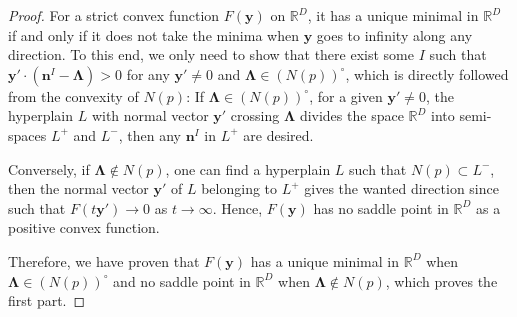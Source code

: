 \documentclass[12pt]{article}
\theoremstyle{definition}
\theoremstyle{plain}
\begin{document}
\begin{proof}
	For a strict convex function $F(\mathbf y)$ on $\mathbb R^D$, it has a unique minimal in $\mathbb R^D$ 
	if and only if it does not take the minima when $\mathbf{y}$ goes to infinity along any direction. 
	To this end, we only need to show that there exist some $I$ such that $\mathbf{y}'\cdot (\mathbf{n}^I-\mathbf{\Lambda})>0$ for any $\mathbf{y}'\neq 0$ and $\mathbf\Lambda \in (N(p))^\circ $, which is directly followed from the convexity of $N(p)$: If $\mathbf\Lambda \in (N(p))^\circ$, for a given $\mathbf{y}'\neq 0$, the hyperplain $L$ with normal vector $\mathbf{y}'$ crossing $\mathbf \Lambda$ 
	divides the space $\mathds{R}^{D}$ into semi-spaces $L^+$ and $L^-$, then any $\mathbf{n}^I$ 
	in $L^+$ are desired.
	
	\begin{center}
	\end{center}
	Conversely, if $\mathbf\Lambda \not\in N(p)$, one can find a hyperplain $L$ such that $N(p)\subset L^-$, 
	then the normal vector $\mathbf{y}'$ of $L$ belonging to $L^{+}$ gives the wanted direction since such that $F(t\mathbf{y}')\to 0$ as $t\to \infty$. Hence, $F(\mathbf y)$ has no saddle point in $\mathds{R}^D$ as a positive convex function.
	
	Therefore, we have proven that $F(\mathbf y)$ has a unique minimal in $\mathbb R^D$ when 
	$\mathbf \Lambda \in (N(p))^\circ$ and no saddle point in $\mathbb R^D$ when 
	$\mathbf \Lambda \not\in N(p)$, which proves the first part.
	

\end{proof}
\end{document}
